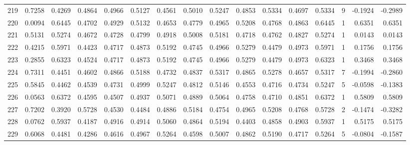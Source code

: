 \begin{tabular}{lrrrrrrrrrrrrrrr}
219 &      0.7258 &  0.4269 &  0.4864 &  0.4966 &  0.5127 &  0.4561 &  0.5010 &  0.5247 &  0.4853 &  0.5334 &   0.4697 &     0.5334 &      9 &                   -0.1924 &                    -0.2989 \\
220 &      0.0094 &  0.6445 &  0.4702 &  0.4929 &  0.5132 &  0.4653 &  0.4779 &  0.4965 &  0.5208 &  0.4768 &   0.4863 &     0.6445 &      1 &                    0.6351 &                     0.6351 \\
221 &      0.5131 &  0.5274 &  0.4672 &  0.4728 &  0.4799 &  0.4918 &  0.5008 &  0.5181 &  0.4718 &  0.4762 &   0.4827 &     0.5274 &      1 &                    0.0143 &                     0.0143 \\
222 &      0.4215 &  0.5971 &  0.4423 &  0.4717 &  0.4873 &  0.5192 &  0.4745 &  0.4966 &  0.5279 &  0.4479 &   0.4973 &     0.5971 &      1 &                    0.1756 &                     0.1756 \\
223 &      0.2855 &  0.6323 &  0.4524 &  0.4717 &  0.4873 &  0.5192 &  0.4745 &  0.4966 &  0.5279 &  0.4479 &   0.4973 &     0.6323 &      1 &                    0.3468 &                     0.3468 \\
224 &      0.7311 &  0.4451 &  0.4602 &  0.4866 &  0.5188 &  0.4732 &  0.4837 &  0.5317 &  0.4865 &  0.5278 &   0.4657 &     0.5317 &      7 &                   -0.1994 &                    -0.2860 \\
225 &      0.5845 &  0.4462 &  0.4539 &  0.4731 &  0.4999 &  0.5247 &  0.4812 &  0.5146 &  0.4553 &  0.4716 &   0.4734 &     0.5247 &      5 &                   -0.0598 &                    -0.1383 \\
226 &      0.0563 &  0.6372 &  0.4595 &  0.4507 &  0.4937 &  0.5071 &  0.4889 &  0.5064 &  0.4758 &  0.4710 &   0.4851 &     0.6372 &      1 &                    0.5809 &                     0.5809 \\
227 &      0.7202 &  0.3920 &  0.5728 &  0.4530 &  0.4484 &  0.4886 &  0.5184 &  0.4754 &  0.4965 &  0.5208 &   0.4768 &     0.5728 &      2 &                   -0.1474 &                    -0.3282 \\
228 &      0.0762 &  0.5937 &  0.4187 &  0.4916 &  0.4914 &  0.5060 &  0.4864 &  0.5194 &  0.4403 &  0.4858 &   0.4903 &     0.5937 &      1 &                    0.5175 &                     0.5175 \\
229 &      0.6068 &  0.4481 &  0.4286 &  0.4616 &  0.4967 &  0.5264 &  0.4598 &  0.5007 &  0.4862 &  0.5190 &   0.4717 &     0.5264 &      5 &                   -0.0804 &                    -0.1587 \\

\end{tabular}
